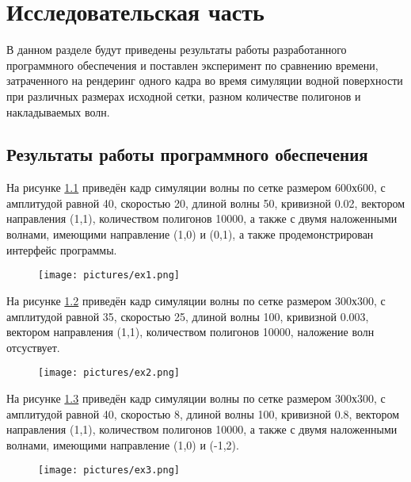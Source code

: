 \chapter{Исследовательская часть}

В данном разделе будут приведены результаты работы разработанного программного обеспечения и поставлен эксперимент по сравнению времени, затраченного на рендеринг одного кадра во время симуляции водной поверхности при различных размерах исходной сетки, разном количестве полигонов и накладываемых волн.

\section{Результаты работы программного обеспечения}

На рисунке \ref{ex1} приведён кадр симуляции волны по сетке размером 600х600, с амплитудой равной 40, скоростью 20, длиной волны 50, кривизной 0.02, вектором направления (1,1), количеством полигонов 10000, а также с двумя наложенными волнами, имеющими направление (1,0) и (0,1), а также продемонстрирован интерфейс программы.

\begin{figure}[H]
	\begin{center}
		\texttt{[image: pictures/ex1.png]}
	\end{center}
	\captionsetup{justification=centering}
	\caption{}
	\label{ex1}
\end{figure}

\newpage

На рисунке \ref{ex2} приведён кадр симуляции волны по сетке размером 300х300, с амплитудой равной 35, скоростью 25, длиной волны 100, кривизной 0.003, вектором направления (1,1), количеством полигонов 10000, наложение волн отсуствует.

\begin{figure}[H]
	\begin{center}
		\texttt{[image: pictures/ex2.png]}
	\end{center}
	\captionsetup{justification=centering}
	\caption{}
	\label{ex2}
\end{figure}


На рисунке \ref{ex3} приведён кадр симуляции волны по сетке размером 300х300, с амплитудой равной 40, скоростью 8, длиной волны 100, кривизной 0.8, вектором направления (1,1), количеством полигонов 10000, а также с двумя наложенными волнами, имеющими направление (1,0) и (-1,2).

\begin{figure}[H]
	\begin{center}
		\texttt{[image: pictures/ex3.png]}
	\end{center}
	\captionsetup{justification=centering}
	\caption{}
	\label{ex3}
\end{figure}



